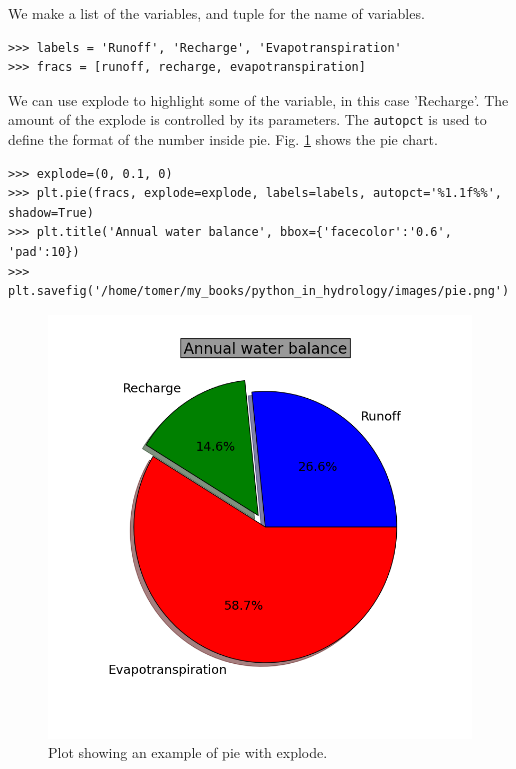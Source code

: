 \documentclass[10pt]{book}
\begin{document}
We make a list of the variables, and tuple for the name of variables. 
\beforeverb \begin{verbatim}
>>> labels = 'Runoff', 'Recharge', 'Evapotranspiration'
>>> fracs = [runoff, recharge, evapotranspiration]
\end{verbatim} \afterverb

We can use explode to highlight some of the variable, in this case 'Recharge'. The amount of the explode is controlled by its parameters. The \verb"autopct" is used to define the format of the number inside pie. Fig. \ref{fig:pie} shows the pie chart. 
\beforeverb \begin{verbatim}
>>> explode=(0, 0.1, 0)
>>> plt.pie(fracs, explode=explode, labels=labels, autopct='%1.1f%%', shadow=True)
>>> plt.title('Annual water balance', bbox={'facecolor':'0.6', 'pad':10})
>>> plt.savefig('/home/tomer/my_books/python_in_hydrology/images/pie.png')
\end{verbatim} \afterverb

\beforefig
\begin{figure}[h!]
  \centering
    \includegraphics[scale=0.5]{images/pie.png}
  \caption{Plot showing an example of pie with explode.}
   \label{fig:pie}
\end{figure}
\afterfig
\end{document}

